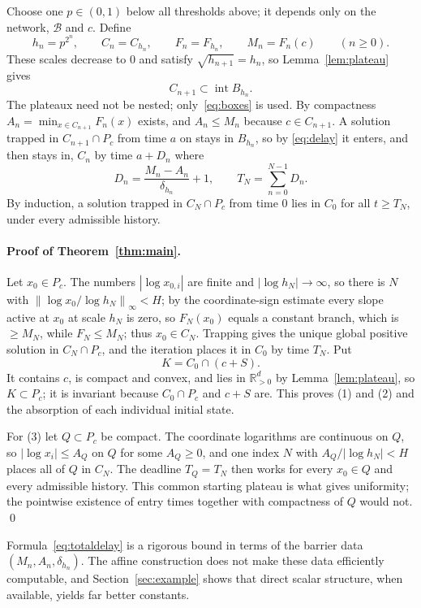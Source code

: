 \documentclass[11pt]{article}
\theoremstyle{definition}
\theoremstyle{remark}
\newcommand{\R}{\mathbb R}
\newcommand{\U}{\R_{>0}^{d}}
\newcommand{\B}{\mathcal B}
\newcommand{\norm}[1]{\left\|#1\right\|}
\DeclareMathOperator{\interior}{int}
\begin{document}
Choose one $p\in(0,1)$ below all thresholds above; it depends only on the network,
$\B$ and $c$. Define
\[
 h_n=p^{2^n},\qquad C_n=C_{h_n},\qquad F_n=F_{h_n},\qquad M_n=F_n(c)\qquad(n\ge0).
\]
These scales decrease to $0$ and satisfy $\sqrt{h_{n+1}}=h_n$, so
Lemma~\ref{lem:plateau} gives
\begin{equation}\label{eq:boxes}
 C_{n+1}\subset\interior B_{h_n}.
\end{equation}
The plateaux need not be nested; only~\eqref{eq:boxes} is used. By compactness
$A_n=\min_{x\in C_{n+1}}F_n(x)$ exists, and $A_n\le M_n$ because $c\in C_{n+1}$.
A solution trapped in $C_{n+1}\cap P_c$ from time $a$ on stays in $B_{h_n}$, so by
\eqref{eq:delay} it enters, and then stays in, $C_n$ by time $a+D_n$ where
\begin{equation}\label{eq:totaldelay}
 D_n=\frac{M_n-A_n}{\delta_{h_n}}+1,\qquad T_N=\sum_{n=0}^{N-1}D_n .
\end{equation}
By induction, a solution trapped in $C_N\cap P_c$ from time $0$ lies in $C_0$ for
all $t\ge T_N$, under every admissible history.

\paragraph{Proof of Theorem~\ref{thm:main}.}
Let $x_0\in P_c$. The numbers $|\log x_{0,i}|$ are finite and $|\log h_N|\to\infty$,
so there is $N$ with $\norm{\log x_0/\log h_N}_\infty<H$; by the coordinate-sign
estimate every slope active at $x_0$ at scale $h_N$ is zero, so $F_N(x_0)$ equals a
constant branch, which is $\ge M_N$, while $F_N\le M_N$; thus $x_0\in C_N$. Trapping
gives the unique global positive solution in $C_N\cap P_c$, and the iteration
places it in $C_0$ by time $T_N$. Put
\[
 K=C_0\cap(c+S).
\]
It contains $c$, is compact and convex, and lies in $\U$ by
Lemma~\ref{lem:plateau}, so $K\subset P_c$; it is invariant because $C_0\cap P_c$ and
$c+S$ are. This proves (1) and (2) and the absorption of each individual initial
state.

For (3) let $Q\subset P_c$ be compact. The coordinate logarithms are continuous on
$Q$, so $|\log x_i|\le A_Q$ on $Q$ for some $A_Q\ge0$, and one index $N$ with
$A_Q/|\log h_N|<H$ places all of $Q$ in $C_N$. The deadline $T_Q=T_N$ then works
for every $x_0\in Q$ and every admissible history. This common starting plateau is
what gives uniformity; the pointwise existence of entry times together with
compactness of $Q$ would not. \qed

Formula~\eqref{eq:totaldelay} is a rigorous bound in terms of the barrier data
$(M_n,A_n,\delta_{h_n})$. The affine construction does not make these data
efficiently computable, and Section~\ref{sec:example} shows that direct scalar
structure, when available, yields far better constants.
\end{document}
